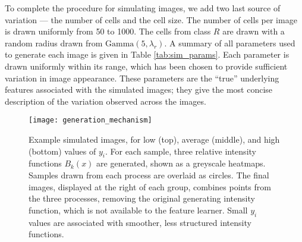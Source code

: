 To complete the procedure for simulating images, we add two last source of
variation — the number of cells and the cell size. The number of cells per image
is drawn uniformly from 50 to 1000. The cells from class $R$ are drawn with a
random radius drawn from $\text{Gamma}\left(5, \lambda_{r}\right)$. A summary of
all parameters used to generate each image is given in Table
\ref{tab:sim_params}. Each parameter is drawn uniformly within its range, which
has been chosen to provide sufficient variation in image appearance. These
parameters are the ``true'' underlying features associated with the simulated
images; they give the most concise description of the variation observed across
the images.

\begin{figure}
  \centering
  \texttt{[image: generation\_mechanism]}
  \caption{Example simulated images, for low (top), average (middle), and high
    (bottom) values of $y_i$. For each sample, three relative intensity
    functions $B_{k}\left(x\right)$ are generated, shown as a greyscale
    heatmaps. Samples drawn from each process are overlaid as circles. The final
    images, displayed at the right of each group, combines points from the three
    processes, removing the original generating intensity function, which is not
    available to the feature learner. Small $y_i$ values are associated with
    smoother, less structured intensity functions.}
  \label{fig:matern_example}
\end{figure}

